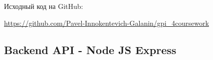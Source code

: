\documentclass[12pt, a4paper, simple]{eskdtext}
\begin{document}
    
    
    Исходный код на GitHub:
    
    \url{https://github.com/Pavel-Innokentevich-Galanin/gpi_4coursework}
    
    \subsection*{Backend API - Node JS Express}
    
    
    
    
    
    
    
    
    
    
    
    \hspace{0pt}

\end{document}
